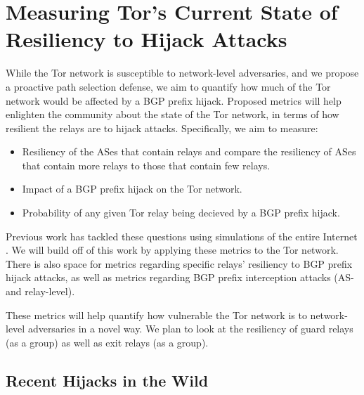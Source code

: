 \section{Measuring Tor's Current State of Resiliency to Hijack Attacks}
While the Tor network is susceptible to network-level adversaries, and we propose a proactive path selection defense, we aim to quantify how much of the Tor network would be affected by a BGP prefix hijack.  Proposed metrics will help enlighten the community about the state of the Tor network, in terms of how resilient the relays are to hijack attacks.  Specifically, we aim to measure:

\begin{itemize}
\item Resiliency of the ASes that contain relays and compare the resiliency of ASes that contain more relays to those that contain few relays.
\item Impact of a BGP prefix hijack on the Tor network.
\item Probability of any given Tor relay being decieved by a BGP prefix hijack.
\end{itemize}

Previous work has tackled these questions using simulations of the entire Internet \cite{lad2007understanding}.  We will build off of this work by applying these metrics to the Tor network.  There is also space for metrics regarding specific relays' resiliency to BGP prefix hijack attacks, as well as metrics regarding BGP prefix interception attacks (AS- and relay-level).  

These metrics will help quantify how vulnerable the Tor network is to network-level adversaries in a novel way.  We plan to look at the resiliency of guard relays (as a group) as well as exit relays (as a group). 

\subsection{Recent Hijacks in the Wild}

